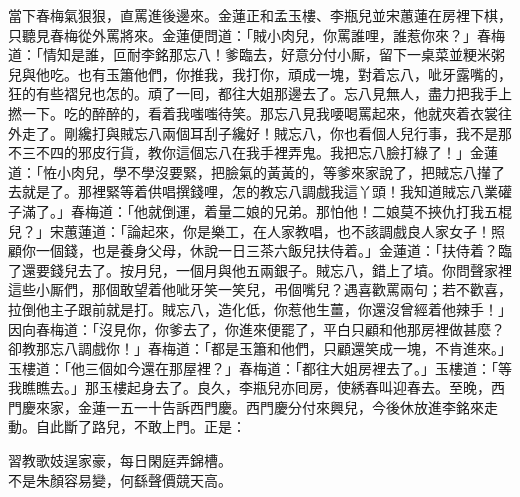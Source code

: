 當下春梅氣狠狠，直罵進後邊來。金蓮正和孟玉樓、李瓶兒並宋蕙蓮在房裡下棋，只聽見春梅從外罵將來。金蓮便問道：「賊小肉兒，你罵誰哩，誰惹你來？」春梅道：「情知是誰，叵耐李銘那忘八！爹臨去，好意分付小厮，留下一桌菜並粳米粥兒與他吃。也有玉簫他們，你推我，我打你，頑成一塊，對着忘八，呲牙露嘴的，狂的有些褶兒也怎的。頑了一囘，都往大姐那邊去了。忘八見無人，盡力把我手上撚一下。吃的醉醉的，看着我嗤嗤待笑。{}那忘八見我喓喝罵起來，他就夾着衣裳往外走了。剛纔打與賊忘八兩個耳刮子纔好！賊忘八，你也看個人兒行事，我不是那不三不四的邪皮行貨，教你這個忘八在我手裡弄鬼。我把忘八臉打綠了！」金蓮道：「恠小肉兒，學不學沒要緊，把臉氣的黃黃的，等爹來家說了，把賊忘八攆了去就是了。那裡緊等着供唱撰錢哩，{}怎的教忘八調戲我這丫頭！我知道賊忘八業礶子滿了。」春梅道：「他就倒運，着量二娘的兄弟。{}那怕他！二娘莫不挾仇打我五棍兒？」宋蕙蓮道：「論起來，你是樂工，在人家教唱，也不該調戲良人家女子！照顧你一個錢，也是養身父母，休說一日三茶六飯兒扶侍着。」金蓮道：「扶侍着？臨了還要錢兒去了。按月兒，一個月與他五兩銀子。賊忘八，錯上了墳。你問聲家裡這些小厮們，那個敢望着他呲牙笑一笑兒，弔個嘴兒？遇喜歡罵兩句；若不歡喜，拉倒他主子跟前就是打。賊忘八，造化低，你惹他生薑，你還沒曾經着他辣手！」{}因向春梅道：「沒見你，你爹去了，你進來便罷了，平白只顧和他那房裡做甚麼？卻教那忘八調戲你！」春梅道：「都是玉簫和他們，只顧還笑成一塊，不肯進來。」玉樓道：「他三個如今還在那屋裡？」春梅道：「都往大姐房裡去了。」玉樓道：「等我瞧瞧去。」那玉樓起身去了。良久，李瓶兒亦囘房，使綉春叫迎春去。至晚，西門慶來家，金蓮一五一十告訴西門慶。西門慶分付來興兒，今後休放進李銘來走動。自此斷了路兒，不敢上門。正是：

\begin{myquote} 
習教歌妓逞家豪，每日閑庭弄錦槽。\\不是朱顏容易變，何繇聲價競天高。
\end{myquote} 

